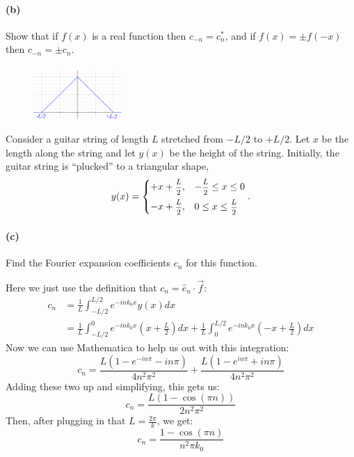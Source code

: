 \documentclass{article}
\begin{document}
\paragraph{(b)}		\extrapart
Show that if $f(x)$ is a real function then $c_{-n} = c_{n}^{*}$, and if $f(x) = \pm f(-x)$ then $c_{-n} = \pm c_{n}$.

\phline
\paragraph{}
	\setlength{\intextsep}{10pt}%
	\begin{figure}
		\includegraphics[width = 0.3\textwidth]{89-PS9-P3-Triangle}
	\end{figure}
Consider a guitar string of length $L$ stretched from $-L/2$ to $+L/2$.  Let $x$ be the length along the string and let $y(x)$ be the height of the string.  Initially, the guitar string is ``plucked'' to a triangular shape,
	\begin{equation*}
		y(x) = \begin{cases} +x+\fracsm{L}{2},	& -\fracsm{L}{2}\leq x \leq 0\\[0.2cm]
		-x+\fracsm{L}{2},	& 0\leq x \leq \fracsm{L}{2} \end{cases}.
	\end{equation*}

\paragraph{(c)}
Find the Fourier expansion coefficients $c_{n}$ for this function.\\

\begin{solution}
	Here we just use the definition that $c_n = \hat{e}_n \cdot \vec f$:
	\begin{align*}
		c_n &= \frac{1}{L}\int_{-L / 2}^{L / 2} e^{-in k_0x} y(x) dx\\
			&= \frac{1}{L}\int_{-L / 2}^0 e^{-in k_0x}\left( x + \frac{L}{2} \right) dx + \frac{1}{L}\int_0^{L / 2} e^{-ink_0x}\left( -x + \frac{L}{2} \right) dx 
	\end{align*}
	Now we can use Mathematica to help us out with this integration:
	\[
		c_n = \frac{L(1 - e^{-in \pi} - in\pi)}{4n^2\pi^2} + \frac{L(1-e^{in \pi } + in \pi)}{4n^2\pi^2}
	\] 
	Adding these two up and simplifying, this gets us:
	\[
	c_n = \frac{L(1-\cos(\pi n))}{2n^2\pi^2}
	\] 
	Then, after plugging in that $L = \frac{2\pi}{k}$, we get:
	\[
	c_n = \frac{1 - \cos(\pi n)}{n^2 \pi k_0}
	\] 
\end{solution}
\phline
\end{document}
